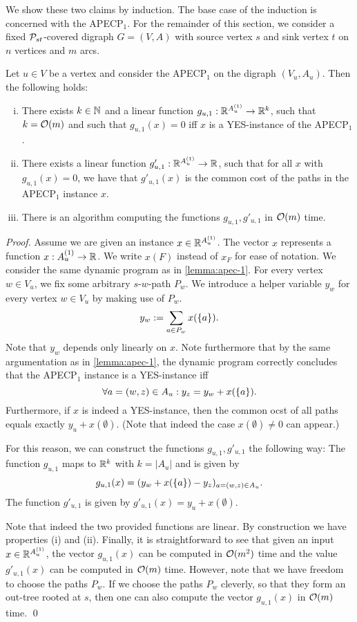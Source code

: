 We show these two claims by induction. The base case of the induction is concerned with the APECP$_1$. For the remainder of this section, we consider a fixed $\mathcal{P}_{st}$-covered digraph $G = (V, A)$ with source vertex $s$ and sink vertex $t$ on $n$ vertices and $m$ arcs.

\begin{lemma}
\label{lemma:subspaces-apec-1}
    Let $u \in V$ be a vertex and consider the APECP$_1$ on the digraph $(V_u, A_u)$. Then the following holds:
    \begin{enumerate}[(i)]
        \item There exists $k \in \mathbb{N}$ and a linear function $g_{u,1} : \mathbb{R}^{A_u^{(1)}} \rightarrow \mathbb{R}^k$, such that $k = \mathcal{O}(m)$ and such that $g_{u,1}(x) = 0$ iff $x$ is a YES-instance of the APECP$_1$.
        \item There exists a linear function $g'_{u,1} : \mathbb{R}^{A_u^{(1)}} \rightarrow \mathbb{R}$, such that for all $x$ with $g_{u,1}(x) = 0$, we have that $g'_{u,1}(x)$ is the common cost of the paths in the APECP$_1$ instance $x$.
        \item There is an algorithm computing the functions $g_{u,1}, g'_{u,1}$ in $\mathcal{O}(m)$ time.
    \end{enumerate}
\end{lemma}
\begin{proof}
    Assume we are given an instance $x \in \mathbb{R}^{A_u^{(1)}}$. The vector $x$ represents a function $x : A_u^{(1)} \rightarrow \mathbb{R}$. We write $x(F)$ instead of $x_F$ for ease of notation.
    We consider the same dynamic program as in \cref{lemma:apec-1}. For every vertex $w \in V_u$, we fix some arbitrary $s$-$w$-path $P_w$.
    We introduce a helper variable $y_w$ for every vertex $w \in V_u$ by making use of $P_w$.
    \[ y_w := \sum_{a \in P_w}x(\{ a \}).\]
    Note that $y_w$ depends only linearly on $x$. Note furthermore that by the same argumentation as in \cref{lemma:apec-1}, the dynamic program correctly concludes that the APECP$_1$ instance is a YES-instance iff
    \[\forall a = (w,z) \in A_u : y_z = y_w + x(\{ a \}). \]
    Furthermore, if $x$ is indeed a YES-instance, then the common ocst of all paths equals exactly $y_u + x(\emptyset)$. (Note that indeed the case $x(\emptyset) \neq 0$ can appear.)

    For this reason, we can construct the functions $g_{u,1}, g'_{u,1}$ the following way: The function $g_{u,1}$ maps to $\mathbb{R}^k$ with $k = |A_u|$ and is given by
    \[ g_{u,1}(x) = ( y_w + x(\{ a \}) - y_z)_{a = (w,z) \in A_u}.\]
    The function $g'_{u,1}$ is given by $g'_{u,1}(x) = y_u + x(\emptyset)$.

    Note that indeed the two provided functions are linear. By construction we have properties (i) and (ii). Finally, it is straightforward to see that given an input $x \in \mathbb{R}^{A_u^{(1)}}$, the vector $g_{u,1}(x)$ can be computed in $\mathcal{O}(m^2)$ time and the value $g'_{u,1}(x)$ can be computed in $\mathcal{O}(m)$ time. However, note that we have freedom to choose the paths $P_w$. If we choose the paths $P_w$ cleverly, so that they form an out-tree rooted at $s$, then one can also compute the vector $g_{u,1}(x)$ in $\mathcal{O}(m)$ time.  \qed
\end{proof}


